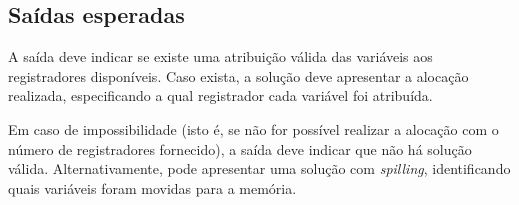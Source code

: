 \subsection{Saídas esperadas}

A saída deve indicar se existe uma atribuição válida das variáveis aos registradores disponíveis.
Caso exista, a solução deve apresentar a alocação realizada, especificando a qual registrador cada variável foi atribuída.

Em caso de impossibilidade (isto é, se não for possível realizar a alocação com o número de registradores fornecido),
a saída deve indicar que não há solução válida. Alternativamente, pode apresentar uma solução com \textit{spilling},
identificando quais variáveis foram movidas para a memória.
